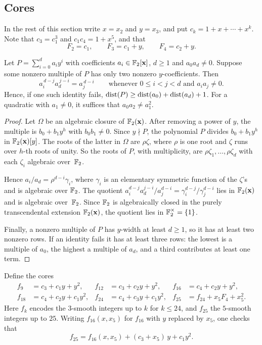 \subsection{Cores}
In the rest of this section write $x=x_2$ and $y=x_3$, and put $c_k=1+x+\cdots+x^k$. Note that $c_3=c_1^3$ and $c_1c_4=1+x^5$, and that
\[
 F_2=c_1,\qquad F_3=c_1+y,\qquad F_4=c_2+y .
\]

\begin{lemma}\label{lem:two-row}
Let $P=\sum_{i=0}^da_iy^i$ with coefficients $a_i\in\mathbb{F}_2[\mathbf{x}]$, $d\ge1$ and $a_0a_d\ne0$. Suppose some nonzero multiple of $P$ has only two nonzero $y$-coefficients. Then
\[
 a_i^{\,d-j}a_d^{\,j-i}=a_j^{\,d-i}\qquad\text{whenever }0\le i<j<d\text{ and }a_ia_j\ne0 .
\]
Hence, if one such identity fails, $\operatorname{dist}(P)\ge\operatorname{dist}(a_0)+\operatorname{dist}(a_d)+1$. For a quadratic with $a_1\ne0$, it suffices that $a_0a_2\ne a_1^2$.
\end{lemma}

\begin{proof}
Let $\Omega$ be an algebraic closure of $\mathbb{F}_2(\mathbf{x})$. After removing a power of $y$, the multiple is $b_0+b_1y^h$ with $b_0b_1\ne0$. Since $y\nmid P$, the polynomial $P$ divides $b_0+b_1y^h$ in $\mathbb{F}_2(\mathbf{x})[y]$. The roots of the latter in $\Omega$ are $\rho\zeta$, where $\rho$ is one root and $\zeta$ runs over $h$-th roots of unity. So the roots of $P$, with multiplicity, are $\rho\zeta_1,\dots,\rho\zeta_d$ with each $\zeta_i$ algebraic over~$\mathbb{F}_2$.

Hence $a_i/a_d=\rho^{d-i}\gamma_i$, where $\gamma_i$ is an elementary symmetric function of the $\zeta$'s and is algebraic over $\mathbb{F}_2$. The quotient $a_i^{d-j}a_d^{j-i}/a_j^{d-i}=\gamma_i^{d-j}/\gamma_j^{d-i}$ lies in $\mathbb{F}_2(\mathbf{x})$ and is algebraic over~$\mathbb{F}_2$. Since $\mathbb{F}_2$ is algebraically closed in the purely transcendental extension $\mathbb{F}_2(\mathbf{x})$, the quotient lies in $\mathbb{F}_2^\times=\{1\}$.

Finally, a nonzero multiple of $P$ has $y$-width at least $d\ge1$, so it has at least two nonzero rows. If an identity fails it has at least three rows: the lowest is a multiple of $a_0$, the highest a multiple of $a_d$, and a third contributes at least one term.
\end{proof}

Define the cores
\begin{align*}
 f_9&=c_3+c_1y+y^2, & f_{12}&=c_3+c_2y+y^2, & f_{16}&=c_4+c_2y+y^2,\\
 f_{18}&=c_4+c_2y+c_1y^2, & f_{24}&=c_4+c_3y+c_1y^2, & f_{25}&=f_{24}+x_5F_4+x_5^2 .
\end{align*}
Here $f_k$ encodes the $3$-smooth integers up to $k$ for $k\le24$, and $f_{25}$ the $5$-smooth integers up to $25$. Writing $f_{16}(x,x_5)$ for $f_{16}$ with $y$ replaced by $x_5$, one checks that
\begin{equation}\label{eq:f25}
 f_{25}=f_{16}(x,x_5)+(c_3+x_5)\,y+c_1y^2 .
\end{equation}

